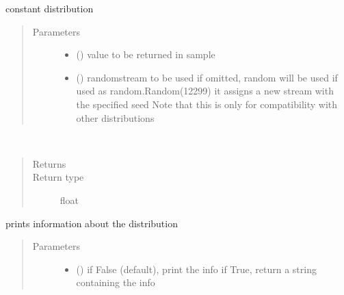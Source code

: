 \documentclass[letterpaper,10pt,english]{sphinxmanual}
\begin{document}

\begin{fulllineitems}
\label{\detokenize{Reference:salabim.Constant}}
constant distribution
\begin{quote}\begin{description}
\item[{Parameters}] \leavevmode\begin{itemize}
\item {} 
 () \textendash{} value to be returned in sample

\item {} 
 () \textendash{} randomstream to be used 
if omitted, random will be used 
if used as random.Random(12299)
it assigns a new stream with the specified seed 
Note that this is only for compatibility with other distributions

\end{itemize}

\end{description}\end{quote}

\begin{fulllineitems}
\label{\detokenize{Reference:salabim.Constant.mean}}~\begin{quote}\begin{description}
\item[{Returns}] \leavevmode
{}

\item[{Return type}] \leavevmode
float

\end{description}\end{quote}

\end{fulllineitems}


\begin{fulllineitems}
\label{\detokenize{Reference:salabim.Constant.print_info}}
prints information about the distribution
\begin{quote}\begin{description}
\item[{Parameters}] \leavevmode\begin{itemize}
\item {} 
 () \textendash{} if False (default), print the info
if True, return a string containing the info


\end{itemize}
\end{description}
\end{quote}
\end{fulllineitems}
\end{fulllineitems}
\end{document}
